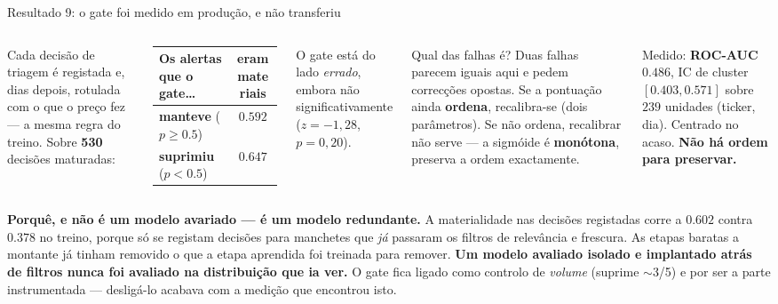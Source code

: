 \documentclass[aspectratio=169]{beamer}
\begin{document}
\begin{frame}{Resultado 9: o gate foi medido em produção, e não transferiu}
\begin{columns}[T]
\small
Cada decisão de triagem é registada e, dias depois, rotulada com o que o preço fez ---
a mesma regra do treino. Sobre \textbf{530} decisões maturadas:
\medskip

\begin{tabular}{lc}
\toprule
\textbf{Os alertas que o gate\dots} & \textbf{eram materiais} \\
\midrule
\textbf{manteve} ($p \ge 0.5$) & $0.592$ \\
\textbf{suprimiu} ($p < 0.5$) & $\mathbf{0.647}$ \\
\bottomrule
\end{tabular}
\medskip

{\footnotesize O gate está do lado \emph{errado}, embora não significativamente
($z=-1{,}28$, $p=0{,}20$).}

\begin{block}{\small Qual das falhas é?}
\small Duas falhas parecem iguais aqui e pedem correcções opostas. Se a pontuação ainda
\textbf{ordena}, recalibra-se (dois parâmetros). Se não ordena, recalibrar não serve ---
a sigmóide é \textbf{monótona}, preserva a ordem exactamente.
\end{block}
\smallskip
{\footnotesize Medido: \textbf{ROC-AUC $0.486$}, IC de cluster $[0.403, 0.571]$ sobre $239$
unidades (ticker, dia). Centrado no acaso. \textbf{Não há ordem para preservar.}}
\end{columns}
\vfill
{\footnotesize\textbf{Porquê, e não é um modelo avariado --- é um modelo redundante.} A
materialidade nas decisões registadas corre a $0.602$ contra $0.378$ no treino, porque só se
registam decisões para manchetes que \emph{já} passaram os filtros de relevância e frescura. As
etapas baratas a montante já tinham removido o que a etapa aprendida foi treinada para remover.
\textbf{Um modelo avaliado isolado e implantado atrás de filtros nunca foi avaliado na
distribuição que ia ver.} O gate fica ligado como controlo de \emph{volume} (suprime $\sim$3/5) e
por ser a parte instrumentada --- desligá-lo acabava com a medição que encontrou isto.}
\end{frame}
\end{document}
